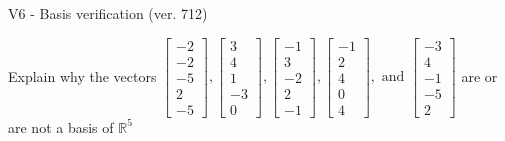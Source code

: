 \begin{exercise}
  \begin{exerciseTitle}V6 - Basis verification (ver. 712)\end{exerciseTitle}
  \begin{exerciseStatement}
    Explain why the vectors \(\left[\begin{array}{r}
-2 \\
-2 \\
-5 \\
2 \\
-5
\end{array}\right] , \left[\begin{array}{r}
3 \\
4 \\
1 \\
-3 \\
0
\end{array}\right] , \left[\begin{array}{r}
-1 \\
3 \\
-2 \\
2 \\
-1
\end{array}\right] , \left[\begin{array}{r}
-1 \\
2 \\
4 \\
0 \\
4
\end{array}\right] , \text{ and } \left[\begin{array}{r}
-3 \\
4 \\
-1 \\
-5 \\
2
\end{array}\right]\) are or are not a basis of \(\mathbb{R}^5\)	



\end{exerciseStatement}
\end{exercise}
